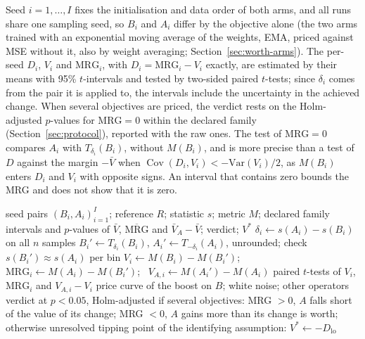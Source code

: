 Seed $i = 1, \dots, I$ fixes the initialisation and data order of both arms,
and all runs share one sampling seed, so $B_i$ and $A_i$ differ by the
objective alone (the two arms trained with an exponential moving average of
the weights, EMA, priced against MSE without it, also by weight averaging;
Section~\ref{sec:worth-arms}). The per-seed $D_i$, $V_i$ and
$\mathrm{MRG}_i$, with $D_i = \mathrm{MRG}_i - V_i$ exactly, are estimated by
their means with 95\% $t$-intervals and tested by two-sided paired
$t$-tests; since $\delta_i$ comes from the pair it is applied to, the
intervals include the uncertainty in the achieved change. When several
objectives are priced, the verdict rests on the Holm-adjusted $p$-values for
$\mathrm{MRG} = 0$ within the declared family (Section~\ref{sec:protocol}),
reported with the raw ones. The test of $\mathrm{MRG} = 0$ compares $A_i$
with $T_{\delta_i}(B_i)$, without $M(B_i)$, and is more precise than a test of
$D$ against the margin $-\bar V$ when
$\operatorname{Cov}(D_i, V_i) < -\mathrm{Var}(V_i)/2$, as $M(B_i)$ enters
$D_i$ and $V_i$ with opposite signs. An interval that contains zero bounds the
MRG and does not show that it is zero.

\begin{algorithm}[tbp]
\caption{The pricing test (same $n$ and $R$, unquantised scoring).}
\label{alg:pricing}
\begin{algorithmic}[1]
\Require seed pairs $(B_i, A_i)_{i=1}^{I}$; reference $R$; statistic $s$;
  metric $M$; declared family
\Ensure intervals and $p$-values of $\bar V$, $\overline{\mathrm{MRG}}$ and
  $\bar V_A - \bar V$; verdict; $V^\ast$
  \State $\delta_i \gets s(A_i) - s(B_i)$ on all $n$ samples
  \State $B_i' \gets T_{\delta_i}(B_i)$, $A_i' \gets T_{-\delta_i}(A_i)$,
    unrounded; check $s(B_i') \approx s(A_i)$ per bin
  \State $V_i \gets M(B_i) - M(B_i')$; \
    $\mathrm{MRG}_i \gets M(A_i) - M(B_i')$; \
    $V_{A,i} \gets M(A_i') - M(A_i)$
\EndFor
\State paired $t$-tests of $V_i$, $\mathrm{MRG}_i$ and $V_{A,i} - V_i$
\State price curve of the boost on $B$; white noise; other operators
\State verdict at $p < 0.05$, Holm-adjusted if several objectives: MRG
  $> 0$, $A$ falls short of the value of its change; MRG $< 0$, $A$ gains more
  than its change is worth; otherwise unresolved
\State tipping point of the identifying assumption:
  $V^\ast \gets -D_{\mathrm{lo}}$
\end{algorithmic}
\end{algorithm}


